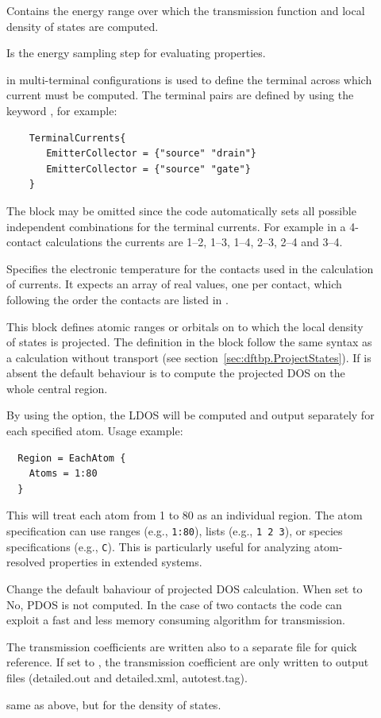 \begin{description}


\item[] Contains the energy range over
  which the transmission function and local density of states are computed.
\item[] Is the energy sampling step for
  evaluating properties.
\item[] in multi-terminal configurations is used to define
  the terminal across which current must be computed. The terminal pairs are
  defined by using the keyword , for example:
   \begin{verbatim}
    TerminalCurrents{
       EmitterCollector = {"source" "drain"}
       EmitterCollector = {"source" "gate"}
    }
  \end{verbatim}
  The block  may be omitted since the code automatically
  sets all possible independent combinations for the terminal currents. For
  example in a 4-contact calculations the currents are 1--2, 1--3, 1--4, 2--3,
  2--4 and 3--4.
\item[] Specifies the electronic
  temperature for the contacts used in the calculation of currents. It expects
  an array of real values, one per contact, which following the order the
  contacts are listed in .
\item[] \label{Region} This block defines atomic ranges or orbitals
  on to which the local density of states is projected. The definition in the
  block follow the same syntax as a \dftbp{} calculation without transport (see
  section~\ref{sec:dftbp.ProjectStates}). If  is absent the default
  behaviour is to compute the projected DOS on the whole central region.

  By using the  option, the LDOS will be computed and
  output separately for each specified atom. Usage example:
  \begin{verbatim}
  Region = EachAtom {
    Atoms = 1:80
  }
  \end{verbatim}
  This will treat each atom from 1 to 80 as an individual region. The atom
  specification can use ranges (e.g., \verb|1:80|), lists (e.g., \verb|1 2 3|),
  or species specifications (e.g., \verb|C|). This is particularly useful for
  analyzing atom-resolved properties in extended systems.
\item[] Change the default bahaviour of projected DOS calculation.
  When set to No, PDOS is not computed. In the case of two contacts
  the code can exploit a fast and less memory consuming algorithm for transmission.
\item[] The transmission coefficients are written also to a
  separate file for quick reference. If set to , the transmission
  coefficient are only written to \dftbp{} output files (detailed.out and
  detailed.xml, autotest.tag).
\item[] same as above, but for the density of states.

\end{description}

